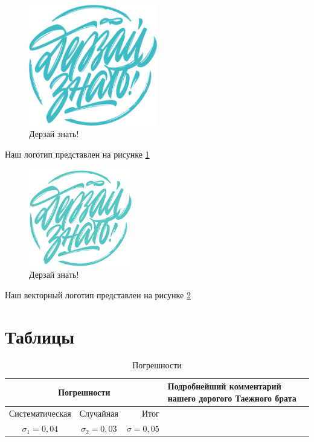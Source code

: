 \documentclass[a4paper,12pt]{article} %
\begin{document}
\begin{figure}[h!]
\begin{center}
\includegraphics[width=0.5\textwidth]{dz_rastr}
\end{center}
\caption{Дерзай знать!} \label{dz1}
\end{figure}

Наш логотип представлен на рисунке \ref{dz1}


\begin{figure}[h!]
\begin{center}
\includegraphics[width=0.4\textwidth]{dz_vec}
\end{center}
\caption{Дерзай знать!} \label{dz2}
\end{figure}

Наш векторный логотип представлен на рисунке \ref{dz2}


\newpage

\section{Таблицы}

\begin{table}
\caption{Погрешности}
\begin{tabular}{|c|c|rp{5cm}|}
\hline 
\multicolumn{3}{|c|}{Погрешности} &  Подробнейший комментарий нашего дорогого Таежного брата\\ 
\hline \hline 
Систематическая & Случайная & Итог & \\ 

$\sigma_1=0,04$ & $\sigma_2=0,03$ & $\sigma=0,05$ & \\ 
\hline 
\end{tabular} 
\end{table}
\end{document}
